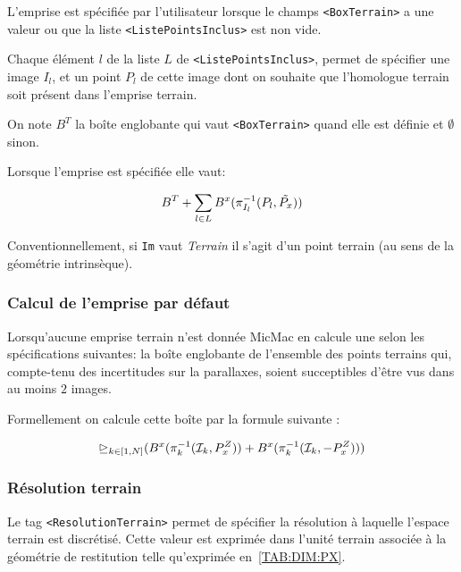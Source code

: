 L'emprise est sp\'ecifi\'ee par l'utilisateur lorsque le
champs {\tt <BoxTerrain>} a une valeur ou que la liste
{\tt <ListePointsInclus>} est non vide.

Chaque \'el\'ement $l$ de la liste $L$ de {\tt <ListePointsInclus>},
permet de sp\'ecifier  une image $I_l$, et un point $P_l$ 
de cette image dont on souhaite que l'homologue terrain soit pr\'esent
dans l'emprise terrain.

On note $B^T$ la bo\^ite englobante qui vaut {\tt <BoxTerrain>} 
quand elle est d\'efinie et $\emptyset$ sinon.

Lorsque l'emprise est sp\'ecifi\'ee elle vaut:

\begin{equation}
   B^T + \sum_{l \in L} B^x(\pi_{I_l}^{-1}(P_l,\PxMoy))
\end{equation}

Conventionnellement, si {\tt Im} vaut \emph{Terrain} il s'agit
d'un point terrain (au sens de la g\'eom\'etrie intrins\`eque).


\subsubsection{Calcul de l'emprise par d\'efaut}

Lorsqu'aucune emprise terrain n'est donn\'ee MicMac
en calcule une selon les sp\'ecifications suivantes: la 
bo\^ite englobante de l'ensemble des points terrains
qui, compte-tenu des incertitudes sur la parallaxes,
soient succeptibles d'\^etre vus dans au moins $2$ images.

\label{Plani:Def:EmpriseTerrain}

Formellement on calcule cette bo\^ite par la formule suivante :

\begin{equation}
   \DeuxExtre_{k\in[1,N]}(B^x(\pi_k^{-1}(\EIm ,\PxZone)) +B^x(\pi_k^{-1}(\EIm ,-\PxZone)))
\end{equation}


\subsubsection{R\'esolution terrain}

\label{Autresec:Resol:Terr}
Le tag {\tt <ResolutionTerrain>} permet de sp\'ecifier la
r\'esolution \`a laquelle l'espace terrain est discr\'etis\'e.
Cette valeur est exprim\'ee dans l'unit\'e terrain associ\'ee
\`a la g\'eom\'etrie de restitution telle qu'exprim\'ee 
en~\ref{TAB:DIM:PX}.

